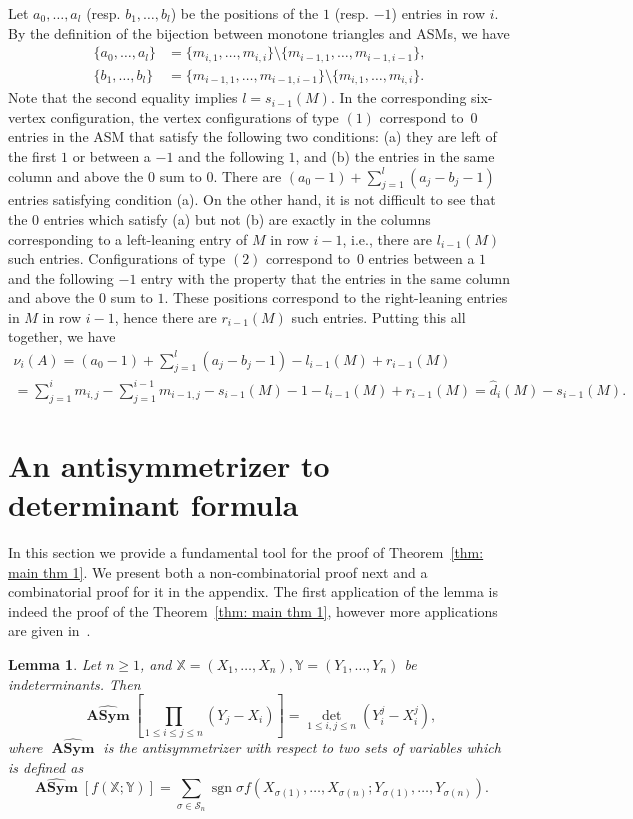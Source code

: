 \documentclass[11pt]{article}
\newtheorem{lemm}[theo]{Lemma}
\theoremstyle{definition}
\numberwithin{equation}{section}
\DeclareMathOperator{\sgn}{sgn}
\DeclareMathOperator{\asym}{\mathbf{ASym}}
\newcounter{x}
\newcounter{y}
\newcounter{z}
\begin{document}
Let $a_0,\ldots,a_l$ (resp. $b_1,\ldots,b_l$) be the positions of the $1$ (resp. $-1$) entries in row $i$. By the definition of the bijection between monotone triangles and ASMs, we have
\begin{align*}
\{a_0,\ldots,a_l\} &= \{m_{i,1}, \ldots ,m_{i,i} \} \setminus \{ m_{i-1,1}, \ldots , m_{i-1,i-1}\},\\
\{b_1,\ldots,b_l\} &= \{ m_{i-1,1}, \ldots , m_{i-1,i-1}\} \setminus \{m_{i,1}, \ldots ,m_{i,i} \}.
\end{align*}
Note that the second equality implies $l=s_{i-1}(M)$.
In the corresponding six-vertex configuration, the vertex configurations of type $(1)$ correspond to~$0$ entries in the ASM that satisfy the following two conditions: (a) they are left of the first $1$ or between a $-1$ and the following $1$, and (b) the entries in the same column and above the $0$ sum to $0$. There are $(a_0-1) + \sum_{j=1}^l (a_j-b_j-1)$ entries satisfying condition (a). On the other hand, it is not difficult to see that the $0$ entries which satisfy (a) but not (b) are exactly in the columns corresponding to a left-leaning entry of $M$ in row $i-1$, i.e., there are $l_{i-1}(M)$ such entries. Configurations of type $(2)$ correspond to~$0$ entries between a $1$ and the following $-1$ entry with the property that the entries in the same column and above the $0$ sum to $1$. These positions correspond to the right-leaning entries in $M$ in row $i-1$, hence there are $r_{i-1}(M)$ such entries. Putting this all together, we have
\begin{multline*}
\nu_i(A) = (a_0-1) + \sum_{j=1}^l (a_j-b_j-1)  - l_{i-1}(M) + r_{i-1}(M)\\
= \sum_{j=1}^i m_{i,j} - \sum_{j=1}^{i-1} m_{i-1,j}  -s_{i-1}(M)-1- l_{i-1}(M) + r_{i-1}(M)
=\widehat{d}_i(M)  -s_{i-1}(M).
\end{multline*}

\section{An antisymmetrizer to determinant formula}
\label{sec: antisym to det}
In this section we provide a fundamental tool for the proof of Theorem~\ref{thm: main thm 1}. We present both a non-combinatorial proof next and a combinatorial proof for it in the appendix. The first 
application of the lemma is indeed the proof of the Theorem~\ref{thm: main thm 1}, however 
more applications are given in~\cite{FH2022,FischerSchreierAigner23}.

\begin{lemm}  
\label{lem: general}
Let $n \ge 1$, and $\mathbb{X}=(X_1,\ldots,X_n), \mathbb{Y}=(Y_1,\ldots,Y_n)$ be indeterminants.
 Then
\[
\widehat{\asym}  \left[  \prod_{1 \le i \le j \le n} (Y_j-X_i)     \right]
= \det_{1 \le i, j \le n} \left( Y_i^j - X_i^j \right),
\]
where $\widehat{\asym}$ is the antisymmetrizer with respect to two sets of variables which is defined as
\[
\widehat{\asym} \left[f(\mathbb{X};\mathbb{Y})\right] = \sum_{\sigma \in {\mathcal{S}_n}} \sgn \sigma f(X_{\sigma(1)},\ldots,X_{\sigma(n)};Y_{\sigma(1)},\ldots,Y_{\sigma(n)}).
\] 
\end{lemm}
\end{document}
